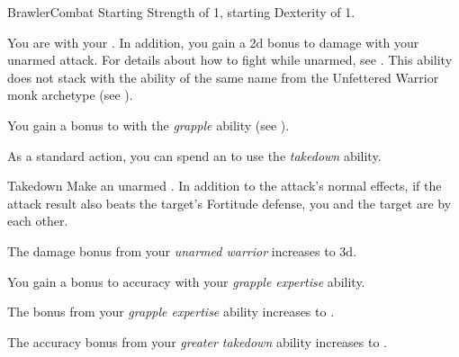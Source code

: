     \begin{feat}{Brawler}{Combat}
        \featpre Starting Strength of 1, starting Dexterity of 1.

         You are  with your .
        In addition, you gain a \plus2d bonus to damage with your unarmed attack.
        For details about how to fight while unarmed, see .
        This ability does not stack with the ability of the same name from the Unfettered Warrior monk archetype (see ).

         You gain a  bonus to  with the \textit{grapple} ability (see ).

         As a standard action, you can spend an  to use the \textit{takedown} ability.
        \begin{ability}{Takedown}
            Make an unarmed .
            In addition to the attack's normal effects, if the attack result also beats the target's Fortitude defense, you and the target are \grappled by each other.
        \end{ability}

         The damage bonus from your \textit{unarmed warrior} increases to \plus3d.

         You gain a  bonus to accuracy with your \textit{grapple expertise} ability.

         The bonus from your \textit{grapple expertise} ability increases to .

         The accuracy bonus from your \textit{greater takedown} ability increases to .
    \end{feat}

